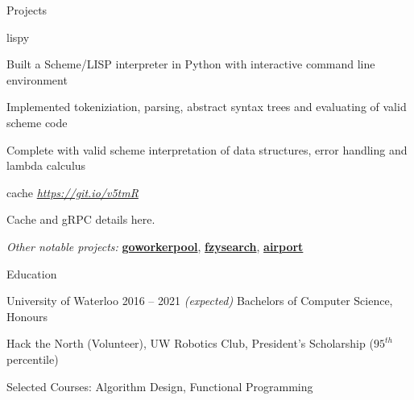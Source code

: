 \documentclass{resume} %
\begin{document}
\begin{rSection}{Projects}
\begin{rSubsection}{lispy}
    \item Built a Scheme/LISP interpreter in Python with interactive command line environment
    \item Implemented tokeniziation, parsing, abstract syntax trees and evaluating of valid scheme code
    \item Complete with valid scheme interpretation of data structures, error handling and lambda calculus
  \end{rSubsection}
  
  \begin{rSubsection}{cache}
	  {\em{ \href{http://github.com/ridwanmsharif/cache}
		    {https://git.io/v5tmR}}}
	  {}

    \item Cache and gRPC details here.
  \end{rSubsection}

  \begin{rMinisection}
    \item {\em Other notable projects:}
      \href{https://github.com/ridwanmsharif/goworkerpool}{\textbf{goworkerpool}},
      \href{https://github.com/ridwanmsharif/fzysearch}{\textbf{fzysearch}},
      \href{https://github.com/ridwanmsharif/airport}{\textbf{airport}}
  \end{rMinisection}
\end{rSection}


\begin{rSection}{Education}
  \begin{rSubsection}{University of Waterloo}
		     {2016 -- 2021 \em (expected)}
		     {Bachelors of Computer Science, Honours}
		     {}
    \item Hack the North (Volunteer), UW Robotics Club,
		President's Scholarship ($95^{th}$ percentile)
    \item Selected Courses: Algorithm Design, Functional Programming
  \end{rSubsection}
\end{rSection} 
\end{document}
